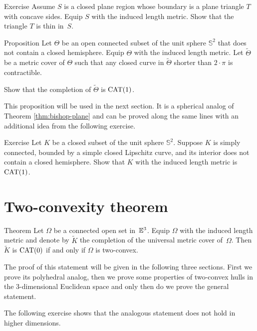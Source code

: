 \begin{thm}[!]{Exercise}\label{ex:concave-triangle}
Assume $S$ is a closed plane 
region whose boundary is a plane triangle $T$ with concave sides.
Equip $S$ with the induced length metric.
Show that the triangle $T$ is thin in~$S$.
\end{thm}

\begin{thm}{Proposition}\label{prop:bishop-sphere}
Let $\Theta$ be an open connected subset of the unit sphere $\mathbb{S}^2$ that does not contain a closed hemisphere.
Equip $\Theta$ with the induced length metric.
Let $\tilde \Theta$ be a metric cover of $\Theta$ 
such that any closed curve in $\tilde \Theta$ shorter than $2\cdot\pi$ is contractible.

Show that the completion of $\tilde \Theta$ is $\mathrm{CAT}(1)$.
\end{thm}


This proposition will be used in the next section.
It is a spherical analog of Theorem \ref{thm:bishop-plane}
and can be proved along the same lines with an additional idea from the following exercise.

\begin{thm}{Exercise}\label{ex:bishop-sphere}
Let $K$ be a closed subset of the unit sphere $\mathbb{S}^2$.
Suppose $K$ is simply connected, bounded by a simple closed Lipschitz curve, and its interior does not contain a closed hemisphere.
Show that $K$ with the induced length metric is $\mathrm{CAT}(1)$.
\end{thm}

\section{Two-convexity theorem}

\begin{thm}{Theorem}\label{thm:shefel}
Let $\Omega$ be a connected open set in~$\mathbb{E}^3$.
Equip $\Omega$ with the induced length metric
and denote by $\tilde K$ the completion of the universal metric cover of~$\Omega$.
Then $\tilde K$ is $\mathrm{CAT}(0)$ 
if and only if $\Omega$ is two-convex.
\end{thm}

The proof of this statement will be given in the following three sections.
First we prove its polyhedral analog, then we prove some properties of two-convex hulls in the 3-dimensional Euclidean space and only then do we prove the general statement.

The following exercise shows that the analogous statement does not hold in higher dimensions.

